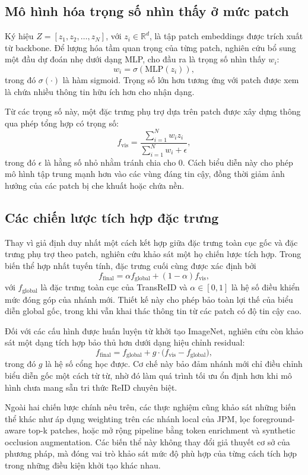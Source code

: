 \subsection{Mô hình hóa trọng số nhìn thấy ở mức patch}

Ký hiệu \(Z=[z_1,z_2,\dots,z_N]\), với \(z_i \in \mathbb{R}^{d}\), là tập patch embeddings được trích xuất từ backbone. Để lượng hóa tầm quan trọng của từng patch, nghiên cứu bổ sung một đầu dự đoán nhẹ dưới dạng MLP, cho đầu ra là trọng số nhìn thấy \(w_i\):
\[
w_i = \sigma(\mathrm{MLP}(z_i)),
\]
trong đó \(\sigma(\cdot)\) là hàm sigmoid. Trọng số lớn hơn tương ứng với patch được xem là chứa nhiều thông tin hữu ích hơn cho nhận dạng.

Từ các trọng số này, một đặc trưng phụ trợ dựa trên patch được xây dựng thông qua phép tổng hợp có trọng số:
\[
f_{\mathrm{vis}} = \frac{\sum_{i=1}^{N} w_i z_i}{\sum_{i=1}^{N} w_i + \epsilon},
\]
trong đó \(\epsilon\) là hằng số nhỏ nhằm tránh chia cho $0$. Cách biểu diễn này cho phép mô hình tập trung mạnh hơn vào các vùng đáng tin cậy, đồng thời giảm ảnh hưởng của các patch bị che khuất hoặc chứa nền.

\subsection{Các chiến lược tích hợp đặc trưng}

Thay vì giả định duy nhất một cách kết hợp giữa đặc trưng toàn cục gốc và đặc trưng phụ trợ theo patch, nghiên cứu khảo sát một họ chiến lược tích hợp. Trong biến thể hợp nhất tuyến tính, đặc trưng cuối cùng được xác định bởi
\[
f_{\mathrm{final}} = \alpha f_{\mathrm{global}} + (1-\alpha) f_{\mathrm{vis}},
\]
với \(f_{\mathrm{global}}\) là đặc trưng toàn cục của TransReID và \(\alpha \in [0,1]\) là hệ số điều khiển mức đóng góp của nhánh mới. Thiết kế này cho phép bảo toàn lợi thế của biểu diễn global gốc, trong khi vẫn khai thác thông tin từ các patch có độ tin cậy cao.

Đối với các cấu hình được huấn luyện từ khởi tạo ImageNet, nghiên cứu còn khảo sát một dạng tích hợp bảo thủ hơn dưới dạng hiệu chỉnh residual:
\[
f_{\mathrm{final}} = f_{\mathrm{global}} + g \cdot \bigl(f_{\mathrm{vis}} - f_{\mathrm{global}}\bigr),
\]
trong đó \(g\) là hệ số cổng học được. Cơ chế này bảo đảm nhánh mới chỉ điều chỉnh biểu diễn gốc một cách từ từ, nhờ đó làm quá trình tối ưu ổn định hơn khi mô hình chưa mang sẵn tri thức ReID chuyên biệt.

Ngoài hai chiến lược chính nêu trên, các thực nghiệm cũng khảo sát những biến thể khác như áp dụng weighting trên các nhánh local của JPM, lọc foreground-aware top-k patches, hoặc mở rộng pipeline bằng token enrichment và synthetic occlusion augmentation. Các biến thể này không thay đổi giả thuyết cơ sở của phương pháp, mà đóng vai trò khảo sát mức độ phù hợp của từng cách tích hợp trong những điều kiện khởi tạo khác nhau.

